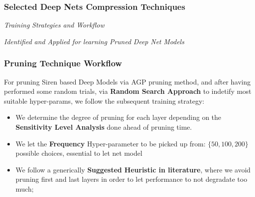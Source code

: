 
\begin{frame}
    \frametitle{Selected Deep Nets Compression Techniques}
        \begin{center}
            {\fontsize{40}{50}\selectfont \emph{Training Strategies and Workflow}}
        \end{center}
        \begin{center}
            \emph{Identified and Applied for learning Pruned Deep Net Models}
        \end{center}
\end{frame}

\begin{frame}
    \frametitle{Pruning Technique Workflow}
    For pruning Siren based Deep Models via AGP pruning method, and after having performed some random trials,
        via \textbf{Random Search Approach} to indetify most suitable hyper-params, we follow the subsequent training strategy:
    \begin{itemize}
            \item We determine the degree of pruning for each layer depending on the \textbf{Sensitivity Level Analysis} done ahead of pruning time.
            \item We let the \textbf{Frequency} Hyper-parameter to be picked up from: $\{50, 100, 200\}$ possible choices, essential to let net model
            \item We follow a generically \textbf{Suggested Heuristic in literature}, where we avoid pruning first and last layers
                in order to let performance to not degradate too much;
    \end{itemize}
\end{frame}
